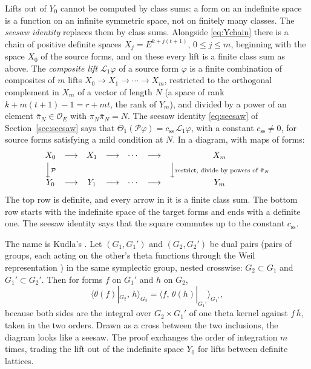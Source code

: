 \documentclass[11pt]{amsart}
\numberwithin{equation}{section}
\theoremstyle{definition}
\theoremstyle{remark}
\newcommand{\cO}{\mathcal O}
\begin{document}
Lifts out of $Y_0$ cannot be computed by class sums: a form on an indefinite space is a function on an infinite symmetric space, not on finitely many classes. The \emph{seesaw identity} replaces them by class sums. Alongside \eqref{eq:Ychain} there is a chain of positive definite spaces $X_j=E^{k+j(t+1)}$, $0\le j\le m$, beginning with the space $X_0$ of the source forms, and on these every lift is a finite class sum as above. The \emph{composite lift} $\mathcal L_1\varphi$ of a source form $\varphi$ is a finite combination of composites of $m$ lifts $X_0\to X_1\to\cdots\to X_m$, restricted to the orthogonal complement in $X_m$ of a vector of length $N$ (a space of rank $k+m(t+1)-1=r+mt$, the rank of $Y_m$), and divided by a power of an element $\bar\pi_N\in\cO_E$ with $\pi_N\bar\pi_N=N$. The seesaw identity \eqref{eq:seesaw} of Section~\ref{sec:seesaw} says that $\Theta_1(\mathcal P\varphi)=c_{\mathrm{ss}}\,\mathcal L_1\varphi$, with a constant $c_{\mathrm{ss}}\ne0$, for source forms satisfying a mild condition at $N$. In a diagram, with maps of forms:
\begin{equation}\label{eq:square}
\begin{array}{ccccccc}
 X_0&\longrightarrow&X_1&\longrightarrow&\cdots&\longrightarrow&X_m\\[2pt]
 \Big\downarrow{\scriptstyle\mathcal P}&&&&&&\Big\downarrow{\scriptstyle\text{restrict, divide by powers of }\bar\pi_N}\\[2pt]
 Y_0&\longrightarrow&Y_1&\longrightarrow&\cdots&\longrightarrow&Y_m
\end{array}
\end{equation}
The top row is definite, and every arrow in it is a finite class sum. The bottom row starts with the indefinite space of the target forms and ends with a definite one. The seesaw identity says that the square commutes up to the constant $c_{\mathrm{ss}}$.

The name is Kudla's \cite{kudla}. Let $(G_1,G_1')$ and $(G_2,G_2')$ be dual pairs (pairs of groups, each acting on the other's theta functions through the Weil representation \cite{weil64}) in the same symplectic group, nested crosswise: $G_2\subset G_1$ and $G_1'\subset G_2'$. Then for forms $f$ on $G_1'$ and $h$ on $G_2$,
\begin{equation}\label{eq:classicalseesaw}
 \bigl\langle\theta(f)|_{G_2},\,h\bigr\rangle_{G_2}=\bigl\langle f,\,\theta(h)|_{G_1'}\bigr\rangle_{G_1'},
\end{equation}
because both sides are the integral over $G_2\times G_1'$ of one theta kernel against $f\,\bar h$, taken in the two orders. Drawn as a cross between the two inclusions, the diagram looks like a seesaw. The proof exchanges the order of integration $m$ times, trading the lift out of the indefinite space $Y_0$ for lifts between definite lattices.
\end{document}
